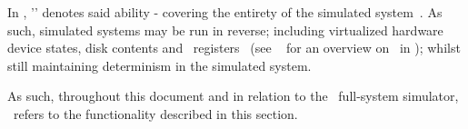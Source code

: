 In \dvttermsimics , '\dvttermreverseexecution ' denotes said ability - covering the entirety of the simulated system~.
As such, simulated systems may be run in reverse; including virtualized hardware device states, disk contents and \dvttermcpu\ registers~ (see ~ for an overview on \dvttermreverseexecution\ in \dvttermsimics ); whilst still maintaining determinism in the simulated system.

As such, throughout this document and in relation to the \dvttermsimics\ full-system simulator, \dvttermreverseexecution\ refers to the functionality described in this section.

